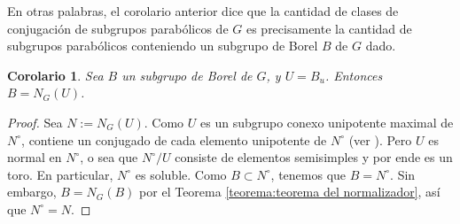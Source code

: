 \documentclass[spanish,12pt]{amsart}
\newtheorem{corollary}[theorem]{Corolario}
\theoremstyle{definition}
\theoremstyle{remark}
\numberwithin{equation}{section}
\begin{document}
En otras palabras, el corolario anterior dice que la cantidad de clases de conjugación de subgrupos parabólicos de $G$ es precisamente la cantidad de subgrupos parabólicos conteniendo un subgrupo de Borel $B$ de $G$ dado.

\begin{corollary}
Sea $B$ un subgrupo de Borel de $G$, y $U = B_u$. Entonces $B = N_G (U)$.
\end{corollary}
\begin{proof}
Sea $N := N_G (U)$. Como $U$ es un subgrupo conexo unipotente maximal de $N^\circ$, contiene un conjugado de cada elemento unipotente de $N^\circ$ (ver \cite[Teorema 22.2]{humphreys2012linearAlgebraicGroups}). Pero $U$ es normal en $N^\circ$, o sea que $N^\circ / U$ consiste de elementos semisimples y por ende es un toro. En particular, $N^\circ$ es soluble. Como $B \subset N^\circ$, tenemos que $B = N^\circ$. Sin embargo, $B = N_G (B)$ por el Teorema \ref{teorema:teorema del normalizador}, así que $N^\circ = N$.
\end{proof}









\end{document}
